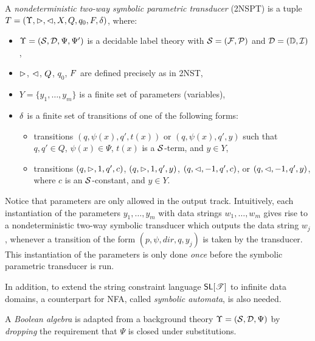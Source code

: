 \begin{definition}
A \emph{nondeterministic two-way symbolic parametric transducer} (2NSPT) is a tuple
$T=(\Upsilon, \vartriangleright, \vartriangleleft, X, Q, q_0, F, \delta)$, where:
\begin{itemize}
\item $\Upsilon=(\mathcal{S},\mathcal{D}, \Psi, \Psi')$ is a decidable label theory with $\mathcal{S} = ({\mathcal{F}}, {\mathcal{P}})$ and $\mathcal{D} = (\mathbb{D}, \mathcal{I})$,
%
\item $\vartriangleright$, $\vartriangleleft$, $Q$, $q_0$, $F$ are defined precisely as in 2NST, 
%
\item $Y=\{y_1,\ldots, y_m\}$ is a finite set of parameters (variables), 
%
\item $\delta$ is a finite set of transitions of one of the following forms: 
\begin{itemize}
\item transitions $(q, \psi(x), q', t(x))$ or $(q, \psi(x), q', y)$ such that $q,q' \in Q$, $\psi(x) \in \Psi$,
$t(x)$ is a $\mathcal{S}$-term, and $y \in Y$,
%
\item transitions $(q, \vartriangleright, 1, q', c)$, $(q, \vartriangleright, 1, q', y)$, $(q, \vartriangleleft, -1, q', c)$,  or $(q, \vartriangleleft, -1, q', y)$, where $c$ is an $\mathcal{S}$-constant, and $y \in Y$. 
\end{itemize}
\end{itemize}
\end{definition}

Notice that parameters are only allowed in the output track.
Intuitively, each instantiation of the parameters $y_1,\ldots, y_m$ with data strings 
$w_1,\ldots, w_m$ gives rise to a nondeterministic two-way symbolic transducer which outputs
the data string $w_j$, whenever a transition of the form $(p, \psi, dir, q, y_j)$ is
taken by the transducer. This instantiation of the parameters is only done 
\emph{once} before the symbolic parametric transducer is run.

In addition, to extend the string constraint language $\textsf{SL}[\mathscr{T}]$ to infinite data domains, a counterpart for NFA, called \emph{symbolic automata}, is also needed. 

A \emph{Boolean algebra} is adapted from a background theory $\Upsilon=(\mathcal{S},\mathcal{D}, \Psi)$ by \emph{dropping} the requirement that $\Psi$ is closed under substitutions.

